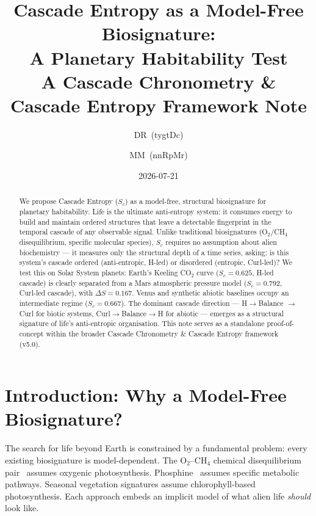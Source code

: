 \documentclass[12pt,a4paper]{article}
\begin{document}
\title{\textbf{Cascade Entropy as a Model-Free Biosignature:}\\[4pt]
       \textbf{A Planetary Habitability Test}\\[10pt]
       \large A Cascade Chronometry \& Cascade Entropy Framework Note}

\author{DR~(tygtDc) \and MM~(nnRpMr)}
\date{2026-07-21}

\maketitle

\begin{abstract}
We propose Cascade Entropy ($S_c$) as a model-free, structural biosignature
for planetary habitability. Life is the ultimate anti-entropy system: it
consumes energy to build and maintain ordered structures that leave a
detectable fingerprint in the temporal cascade of any observable signal.
Unlike traditional biosignatures (O$_2$/CH$_4$ disequilibrium, specific
molecular species), $S_c$ requires no assumption about alien biochemistry
--- it measures only the structural depth of a time series, asking: is this
system's cascade ordered (anti-entropic, H-led) or disordered (entropic,
Curl-led)? We test this on Solar System planets: Earth's Keeling CO$_2$
curve ($S_c = 0.625$, H-led cascade) is clearly separated from a Mars
atmospheric pressure model ($S_c = 0.792$, Curl-led cascade), with $\Delta S
= 0.167$. Venus and synthetic abiotic baselines occupy an intermediate regime
($S_c = 0.667$). The dominant cascade direction --- H$\rightarrow$Balance
$\rightarrow$Curl for biotic systems, Curl$\rightarrow$Balance$\rightarrow$H
for abiotic --- emerges as a structural signature of life's anti-entropic
organisation. This note serves as a standalone proof-of-concept within the
broader Cascade Chronometry \& Cascade Entropy framework (v5.0).
\end{abstract}

\section{Introduction: Why a Model-Free Biosignature?}

The search for life beyond Earth is constrained by a fundamental problem:
every existing biosignature is model-dependent. The O$_2$--CH$_4$ chemical
disequilibrium pair~\cite{lovelock1965, krissansen2018} assumes
oxygenic photosynthesis. Phosphine~\cite{greaves2021} assumes specific
metabolic pathways. Seasonal vegetation signatures assume chlorophyll-based
photosynthesis. Each approach embeds an implicit model of what alien life
\emph{should} look like.
\end{document}

